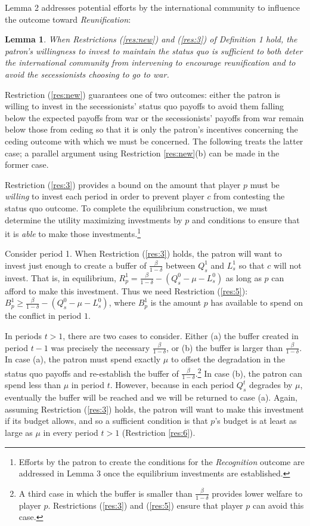 \documentclass[11pt,letterpaper, notitlepage]{article}
\newtheorem{lemma}{Lemma}
\newcommand{\de}{\delta}
\begin{document}
Lemma 2 addresses potential efforts by the international community to influence the outcome toward \emph{Reunification}:

\begin{lemma}
When Restrictions (\ref{res:new}) and (\ref{res:3}) of Definition 1 hold, the patron's willingness to invest to maintain the status quo is sufficient to both deter the international community from intervening to encourage reunification and to avoid the secessionists choosing to go to war.
\end{lemma}

\noindent Restriction (\ref{res:new}) guarantees one of two outcomes: either the patron is willing to invest in the secessionists' status quo payoffs to avoid them falling below the expected payoffs from war or the secessionists' payoffs from war remain below those from ceding so that it is only the patron's incentives concerning the ceding outcome with which we must be concerned. The following treats the latter case; a parallel argument using Restriction \ref{res:new}(b) can be made in the former case.

Restriction (\ref{res:3}) provides a bound on the amount that player $p$ must be \emph{willing} to invest each period in order to prevent player $c$ from contesting the status quo outcome. To complete the equilibrium construction, we must determine the utility maximizing investments by $p$ and conditions to ensure that it is \emph{able} to make those investments.\footnote{Efforts by the patron to create the conditions for the \emph{Recognition} outcome are addressed in Lemma 3 once the equilibrium investments are established.}

Consider period 1. When Restriction (\ref{res:3}) holds, the patron will want to invest just enough to create a buffer of $\frac{\beta}{1-\de}$ between $Q_s^1$ and $L_s^1$ so that $c$ will not invest. That is, in equilibrium, $R_p^1 = \frac{\beta}{1-\de} -(Q_s^0 - \mu - L_s^0)$ as long as $p$ can afford to make this investment. Thus we need Restriction (\ref{res:5}): $B_p^1 \geq\frac{\beta}{1-\de} - \left(Q_s^0 - \mu - L_s^0 \right)$, where $B_p^1$ is the amount $p$ has available to spend on the conflict in period $1$.

In periods $t > 1$, there are two cases to consider. Either (a) the buffer created in period $t-1$ was precisely the necessary $\frac{\beta}{1-\de}$, or (b) the buffer is larger than $\frac{\beta}{1-\de}$. In case (a), the patron must spend exactly $\mu$ to offset the degradation in the status quo payoffs and re-establish the buffer of $\frac{\beta}{1-\de}$.\footnote{A third case in which the buffer is smaller than $\frac{\beta}{1-\de}$ provides lower welfare to player $p$. Restrictions (\ref{res:3}) and (\ref{res:5}) ensure that player $p$ can avoid this case.} In case (b), the patron can spend less than $\mu$ in period $t$. However, because in each period $Q_s^t$ degrades by $\mu$, eventually the buffer will be reached and we will be returned to case (a). Again, assuming Restriction (\ref{res:3}) holds, the patron will want to make this investment if its budget allows, and so a sufficient condition is that $p$'s budget is at least as large as $\mu$ in every period $t > 1$ (Restriction \ref{res:6}). 
\end{document}
